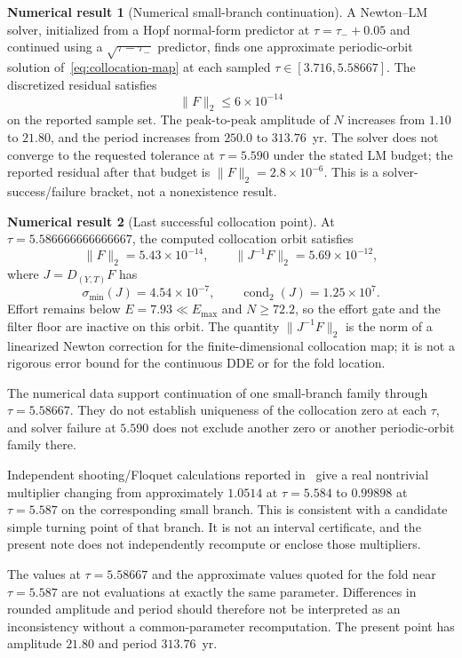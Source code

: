 \documentclass[11pt]{article}
\theoremstyle{definition}
\newtheorem{numresult}{Numerical result}
\begin{document}
\begin{numresult}[Numerical small-branch continuation]
\label{num:branch}
A Newton--LM solver, initialized from a Hopf normal-form predictor at $\tau=\tau_-+0.05$ and continued using a $\sqrt{\tau-\tau_-}$ predictor, finds one approximate periodic-orbit solution of~\eqref{eq:collocation-map} at each sampled $\tau\in[3.716,5.58667]$. The discretized residual satisfies
\[
\|F\|_2\le6\times10^{-14}
\]
on the reported sample set. The peak-to-peak amplitude of $N$ increases from $1.10$ to $21.80$, and the period increases from $250.0$ to $313.76$~yr. The solver does not converge to the requested tolerance at $\tau=5.590$ under the stated LM budget; the reported residual after that budget is $\|F\|_2=2.8\times10^{-6}$. This is a solver-success/failure bracket, not a nonexistence result.
\end{numresult}

\begin{numresult}[Last successful collocation point]
\label{num:zero}
At $\tau=5.586666666666667$, the computed collocation orbit satisfies
\[
\|F\|_2=5.43\times10^{-14},
\qquad
\|J^{-1}F\|_2=5.69\times10^{-12},
\]
where $J=D_{(Y,T)}F$ has
\[
\sigma_{\min}(J)=4.54\times10^{-7},
\qquad
\operatorname{cond}_2(J)=1.25\times10^7.
\]
Effort remains below $E=7.93\ll E_{\max}$ and $N\ge72.2$, so the effort gate and the filter floor are inactive on this orbit. The quantity $\|J^{-1}F\|_2$ is the norm of a linearized Newton correction for the finite-dimensional collocation map; it is not a rigorous error bound for the continuous DDE or for the fold location.
\end{numresult}

The numerical data support continuation of one small-branch family through $\tau=5.58667$. They do not establish uniqueness of the collocation zero at each $\tau$, and solver failure at $5.590$ does not exclude another zero or another periodic-orbit family there.

Independent shooting/Floquet calculations reported in~\cite{paperI} give a real nontrivial multiplier changing from approximately $1.0514$ at $\tau=5.584$ to $0.99898$ at $\tau=5.587$ on the corresponding small branch. This is consistent with a candidate simple turning point of that branch. It is not an interval certificate, and the present note does not independently recompute or enclose those multipliers.

The values at $\tau=5.58667$ and the approximate values quoted for the fold near $\tau=5.587$ are not evaluations at exactly the same parameter. Differences in rounded amplitude and period should therefore not be interpreted as an inconsistency without a common-parameter recomputation. The present point has amplitude $21.80$ and period $313.76$~yr.
\end{document}
